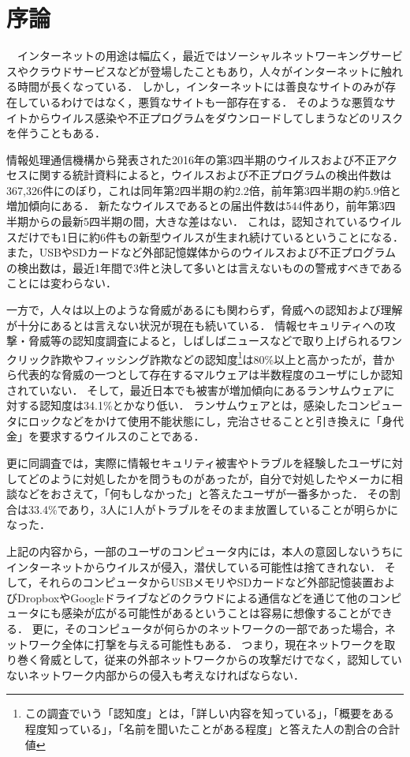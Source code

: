 \chapter{序論}

　インターネットの用途は幅広く，最近ではソーシャルネットワーキングサービスやクラウドサービスなどが登場したこともあり，人々がインターネットに触れる時間が長くなっている．
しかし，インターネットには善良なサイトのみが存在しているわけではなく，悪質なサイトも一部存在する．
そのような悪質なサイトからウイルス感染や不正プログラムをダウンロードしてしまうなどのリスクを伴うこともある．

情報処理通信機構から発表された2016年の第3四半期のウイルスおよび不正アクセスに関する統計資料\cite{joron2}によると，ウイルスおよび不正プログラムの検出件数は367,326件にのぼり，これは同年第2四半期の約2.2倍，前年第3四半期の約5.9倍と増加傾向にある．
新たなウイルスであるとの届出件数は544件あり，前年第3四半期からの最新5四半期の間，大きな差はない．
これは，認知されているウイルスだけでも1日に約6件もの新型ウイルスが生まれ続けているということになる．
また，USBやSDカードなど外部記憶媒体からのウイルスおよび不正プログラムの検出数は，最近1年間で3件と決して多いとは言えないものの警戒すべきであることには変わらない．

一方で，人々は以上のような脅威があるにも関わらず，脅威への認知および理解が十分にあるとは言えない状況が現在も続いている．
情報セキュリティへの攻撃・脅威等の認知度調査\cite{joron1}によると，しばしばニュースなどで取り上げられるワンクリック詐欺やフィッシング詐欺などの認知度\footnote{この調査でいう「認知度」とは，「詳しい内容を知っている」，「概要をある程度知っている」，「名前を聞いたことがある程度」と答えた人の割合の合計値}は80\%以上と高かったが，昔から代表的な脅威の一つとして存在するマルウェアは半数程度のユーザにしか認知されていない．
そして，最近日本でも被害が増加傾向にあるランサムウェア\cite{ransomware}に対する認知度は34.1\%とかなり低い．
ランサムウェアとは，感染したコンピュータにロックなどをかけて使用不能状態にし，完治させることと引き換えに「身代金」を要求するウイルスのことである．

更に同調査では，実際に情報セキュリティ被害やトラブルを経験したユーザに対してどのように対処したかを問うものがあったが，自分で対処したやメーカに相談などをおさえて，「何もしなかった」と答えたユーザが一番多かった．
その割合は33.4\%であり，3人に1人がトラブルをそのまま放置していることが明らかになった．

上記の内容から，一部のユーザのコンピュータ内には，本人の意図しないうちにインターネットからウイルスが侵入，潜伏している可能性は捨てきれない．
そして，それらのコンピュータからUSBメモリやSDカードなど外部記憶装置およびDropboxやGoogleドライブなどのクラウドによる通信などを通じて他のコンピュータにも感染が広がる可能性があるということは容易に想像することができる．
更に，そのコンピュータが何らかのネットワークの一部であった場合，ネットワーク全体に打撃を与える可能性もある．
つまり，現在ネットワークを取り巻く脅威として，従来の外部ネットワークからの攻撃だけでなく，認知していないネットワーク内部からの侵入も考えなければならない．

